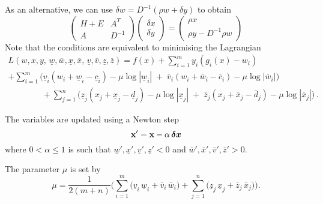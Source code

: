 \documentclass[11pt,a4paper]{article}
\newcommand{\unl}[1]{{\ \!\underline{\;\!\!#1\;\!\!}\ \!}}
\renewcommand{\unl}[1]{{\underline{#1}}}
\newcommand{\ovl}[1]{{\bar{#1}}}
\renewcommand{\ovl}[1]{{\overline{#1}}}
\newcommand{\cl}{{\underline{c}}}
\newcommand{\dl}{{\underline{d}}}
\newcommand{\vl}{{\unl{v}}}
\newcommand{\wl}{{\unl{w}}}
\newcommand{\xl}{{\unl{x}}}
\newcommand{\zl}{{\unl{z}}}
\newcommand{\cu}{{\overline{c}}}
\newcommand{\du}{{\overline{d}}}
\newcommand{\vu}{{\ovl{v}}}
\newcommand{\wu}{{\ovl{w}}}
\newcommand{\xu}{{\ovl{x}}}
\newcommand{\zu}{{\ovl{z}}}
\newcommand{\w}{w}
\newcommand{\x}{x}
\newcommand{\y}{y}
\begin{document}
As an alternative, we can use $\delta\w = D^{-1}(\rho\w+\delta\y)$ to obtain
\begin{equation*}
\left( \begin{array}{cc}
  H\!+\!E & A^T  \\
   A     & D^{-1}
\end{array}\right)
\left( \begin{array}{c} \delta\x\\\delta\y \end{array}\right)
= \left( \begin{array}{c} \rho\x\\\rho\y-D^{-1}\rho\w \end{array}\right)
\end{equation*}
Note that the conditions are equivalent to minimising the Lagrangian
\begin{multline*} L(\w,\x,\y,\,\wl,\wu,\xl,\xu,\,\vl,\vu,\zl,\zu) = f(\x) + \sum_{i=1}^{m} \y_i(g_i(\x)-\w_i) \\
     + \sum_{i=1}^{m} \bigl(  \vl_i(\w_i+\wl_i-\cl_i)\!-\!\mu\log\!|\wl_i| \;+\; \vu_i(\w_i+\wu_i-\cu_i)\!-\!\mu\log\!|\wu_i| \bigr) \\
     \qquad\qquad + \sum_{j=1}^{n} \bigl(  \zl_j(\x_j+\xl_j-\dl_j)\!-\!\mu\log\!|\xl_j| \;+\; \zu_j(\x_j+\xu_j-\du_j)\!-\!\mu\log\!|\xu_j| \bigr) \,. \end{multline*}

The variables are updated using a Newton step
\[ \mathbf{x}' = \mathbf{x} - \alpha \, \mbox{\boldmath$\delta x$} \]
where $0<\alpha\leq 1$ is such that $\wl',\xl',\vl',\zl' < 0$ and $\wu',\xu',\vu',\zu'>0$.

The parameter $\mu$ is set by
\[  \mu = \frac{1}{2(m+n)} \biggl( \sum_{i=1}^{m}\bigl(\vl_i\,\wl_i+\vu_i\,\wu_i\bigr) + \sum_{j=1}^{n}\bigl(\zl_j\,\xl_j+\zu_j\,\xu_j\bigr) \biggr) . \]
\end{document}
